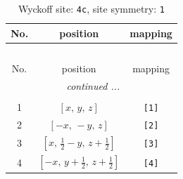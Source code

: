 \documentclass[fleqn,8pt]{jsarticle}
\begin{document}
\renewcommand{\arraystretch}{1.2}
\begin{longtable}{ccc}
\caption{Wyckoff site: {\tt 4c}, site symmetry: {\tt 1}}
 \\
 \hline \hline
No. & position & mapping \\ \hline \endfirsthead

\multicolumn{2}{l}{\tablename\ \thetable{}} \\
 \hline \hline
No. & position & mapping \\ \hline \endhead

 \hline \hline
\multicolumn{2}{r}{\footnotesize\it continued ...} \\ \endfoot

 \hline \hline
\multicolumn{2}{r}{} \\ \endlastfoot

1 & $\left[ x,\, y,\, z \right]$ & {\tt [1]} \\ \hline
2 & $\left[ - x,\, - y,\, z \right]$ & {\tt [2]} \\ \hline
3 & $\left[ x,\, \frac{1}{2} - y,\, z + \frac{1}{2} \right]$ & {\tt [3]} \\ \hline
4 & $\left[ - x,\, y + \frac{1}{2},\, z + \frac{1}{2} \right]$ & {\tt [4]} \\
\end{longtable}
\end{document}
